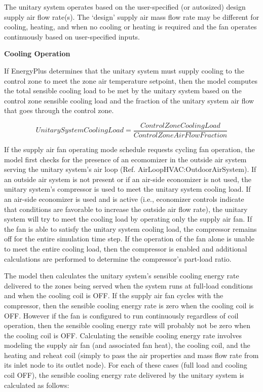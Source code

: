 The unitary system operates based on the user-specified (or autosized) design supply air flow rate(s). The `design' supply air mass flow rate may be different for cooling, heating, and when no cooling or heating is required and the fan operates continuously based on user-specified inputs.

\textbf{Cooling Operation}

If EnergyPlus determines that the unitary system must supply cooling to the control zone to meet the zone air temperature setpoint, then the model computes the total sensible cooling load to be met by the unitary system based on the control zone sensible cooling load and the fraction of the unitary system air flow that goes through the control zone.

\begin{equation}
UnitarySystemCoolingLoad = \frac{{ControlZoneCoolingLoad}}{{ControlZoneAirFlowFraction}}
\end{equation}

If the supply air fan operating mode schedule requests cycling fan operation, the model first checks for the presence of an ecomomizer in the outside air system serving the unitary system's air loop (Ref. AirLoopHVAC:OutdoorAirSystem). If an outside air system is not present or if an air-side economizer is not used, the unitary system's compressor is used to meet the unitary system cooling load. If an air-side economizer is used and is active (i.e., economizer controls indicate that conditions are favorable to increase the outside air flow rate), the unitary system will try to meet the cooling load by operating only the supply air fan. If the fan is able to satisfy the unitary system cooling load, the compressor remains off for the entire simulation time step. If the operation of the fan alone is unable to meet the entire cooling load, then the compressor is enabled and additional calculations are performed to determine the compressor's part-load ratio.

The model then calculates the unitary system's sensible cooling energy rate delivered to the zones being served when the system runs at full-load conditions and when the cooling coil is OFF. If the supply air fan cycles with the compressor, then the sensible cooling energy rate is zero when the cooling coil is OFF. However if the fan is configured to run continuously regardless of coil operation, then the sensible cooling energy rate will probably not be zero when the cooling coil is OFF. Calculating the sensible cooling energy rate involves modeling the supply air fan (and associated fan heat), the cooling coil, and the heating and reheat coil (simply to pass the air properties and mass flow rate from its inlet node to its outlet node). For each of these cases (full load and cooling coil OFF), the sensible cooling energy rate delivered by the unitary system is calculated as follows:

